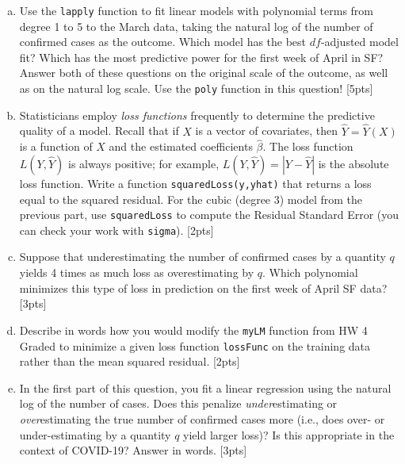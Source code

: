 \documentclass[12pt]{article}
\begin{document}
\begin{enumerate}[(a)]
	\item Use the \verb|lapply| function to fit linear models with polynomial terms from degree 1 to 5 to the March data, taking the natural log of the number of confirmed cases as the outcome. Which model has the best $df$-adjusted model fit? Which has the most predictive power for the first week of April in SF? Answer both of these questions on the original scale of the outcome, as well as on the natural log scale. Use the \verb|poly| function in this question! [5pts]
	\item Statisticians employ \textit{loss functions} frequently to determine the predictive quality of a model. Recall that if $X$ is a vector of covariates, then $\hat{Y} = \hat{Y}(X)$ is a function of $X$ and the estimated coefficients $\hat{\beta}$. The loss function $L(Y,\hat{Y})$ is always positive; for example, $L(Y,\hat{Y}) = |Y-\hat{Y}|$ is the absolute loss function. Write a function \verb|squaredLoss(y,yhat)| that returns a loss equal to the squared residual. For the cubic (degree 3) model from the previous part, use \verb|squaredLoss| to compute the Residual Standard Error (you can check your work with \verb|sigma|). [2pts]
	\item Suppose that underestimating the number of confirmed cases by a quantity $q$ yields 4 times as much loss as overestimating by $q$. Which polynomial minimizes this type of loss in prediction on the first week of April SF data? [3pts]
	\item Describe in words how you would modify the \verb|myLM| function from HW 4 Graded to minimize a given loss function \verb|lossFunc| on the training data rather than the mean squared residual. [2pts]
	\item In the first part of this question, you fit a linear regression using the natural log of the number of cases. Does this penalize \textit{under}estimating or \textit{over}estimating the true number of confirmed cases more (i.e., does over- or under-estimating by a quantity $q$ yield larger loss)? Is this appropriate in the context of COVID-19? Answer in words. [3pts]
\end{enumerate}
\end{document}

